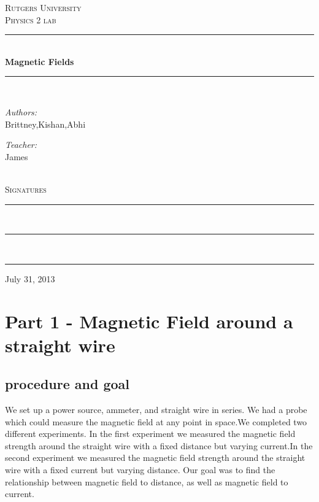 \documentclass[12pt]{article}
\begin{document}
\begin{titlepage}
\begin{center}
	\textsc{\LARGE Rutgers University}\\[1.5 cm]
    \textsc{\Large Physics 2 lab}\\[0.5cm]
    \rule{\linewidth}{0.5mm} \\ [.4 cm]
    {\huge \bfseries Magnetic Fields}\\[.4 cm]
    \rule{\linewidth}{0.5mm} \\ [1.5 cm]
    \begin{minipage}{0.4\textwidth}
	\begin{flushleft} \large
	\emph{Authors:}\\
	Brittney,Kishan,Abhi
	\end{flushleft}
	\end{minipage}
	\begin{minipage}{0.4\textwidth}
	\begin{flushright} \large
	\emph{Teacher:} \\
	James
	\end{flushright}
	\end{minipage}\\[2 cm]
	\textsc{ \Large Signatures} \\[1.7 cm] 
	\rule{10 cm}{0.5mm} \\ [2.0 cm]
	\rule{10 cm}{0.5mm} \\ [2.0 cm]
	\rule{10 cm}{0.5mm}
	\vfill
	{\large {July 31, 2013}}
\end{center}
\end{titlepage}

\section*{Part 1 -  Magnetic Field around a straight wire}
\subsection*{procedure and goal}

We set up a power source, ammeter, and straight wire in series. We had a probe which could measure the magnetic field at any point in space.We completed two different experiments. In the first experiment we measured the magnetic field strength around the straight wire with a fixed distance but varying current.In the second experiment we measured the magnetic field strength around the straight wire with a fixed current but varying distance. Our goal was to find the relationship between magnetic field to distance, as well as magnetic field to current.
\end{document}
